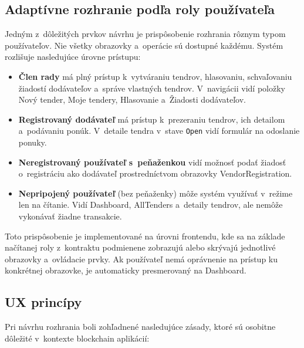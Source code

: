\subsection{Adaptívne rozhranie podľa roly používateľa}
\label{subsec:adaptive_ui}

Jedným z~dôležitých prvkov návrhu je prispôsobenie rozhrania rôznym typom
používateľov. Nie všetky obrazovky a~operácie sú dostupné každému. Systém
rozlišuje nasledujúce úrovne prístupu:

\begin{itemize}
    \item \textbf{Člen rady} má plný prístup k~vytváraniu tendrov,
    hlasovaniu, schvaľovaniu žiadostí dodávateľov a~správe vlastných
    tendrov. V~navigácii vidí položky Nový tender, Moje tendery,
    Hlasovanie a~Žiadosti dodávateľov.

    \item \textbf{Registrovaný dodávateľ} má prístup k~prezeraniu tendrov,
    ich detailom a~podávaniu ponúk. V~detaile tendra v~stave \texttt{Open}
    vidí formulár na odoslanie ponuky.

    \item \textbf{Neregistrovaný používateľ s~peňaženkou} vidí možnosť
    podať žiadosť o~registráciu ako dodávateľ prostredníctvom obrazovky
    VendorRegistration.

    \item \textbf{Nepripojený používateľ} (bez peňaženky) môže systém
    využívať v~režime len na čítanie. Vidí Dashboard, AllTenders a~detaily
    tendrov, ale nemôže vykonávať žiadne transakcie.
\end{itemize}

Toto prispôsobenie je implementované na úrovni frontendu, kde sa na
základe načítanej roly z~kontraktu podmienene zobrazujú alebo skrývajú
jednotlivé obrazovky a~ovládacie prvky. Ak používateľ nemá oprávnenie
na prístup ku konkrétnej obrazovke, je automaticky presmerovaný na
Dashboard.

\subsection{UX princípy}
\label{subsec:ux_principles}

Pri návrhu rozhrania boli zohľadnené nasledujúce zásady, ktoré sú osobitne
dôležité v~kontexte blockchain aplikácií:

